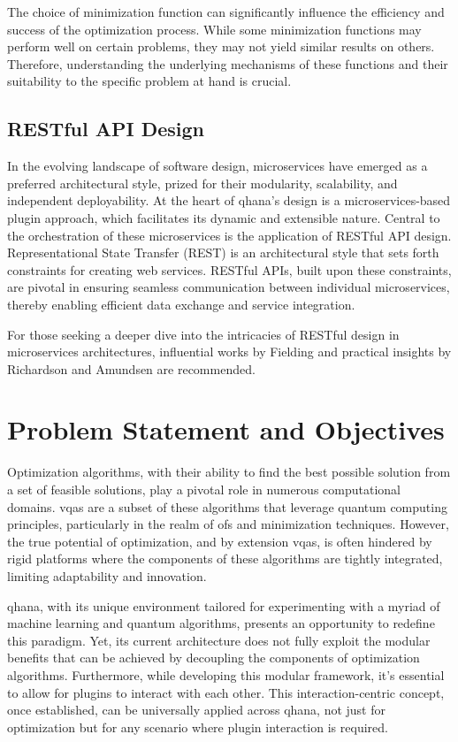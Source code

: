 \documentclass[
  a4paper,  %
  twoside,  %
  bibliography=totoc,
  headsepline,
  cleardoublepage=empty,
  parskip=half,
  draft=false
]{scrbook}
\begin{document}
The choice of minimization function can significantly influence the efficiency and success of the optimization process.
While some minimization functions may perform well on certain problems, they may not yield similar results on others.
Therefore, understanding the underlying mechanisms of these functions and their suitability to the specific problem at hand is crucial.


\section{RESTful API Design}
In the evolving landscape of software design, microservices have emerged as a preferred architectural style, prized for their modularity, scalability, and independent deployability.
At the heart of \gls{qhana}'s design is a microservices-based plugin approach, which facilitates its dynamic and extensible nature.
Central to the orchestration of these microservices is the application of RESTful API design.
Representational State Transfer (REST) is an architectural style that sets forth constraints for creating web services.
RESTful APIs, built upon these constraints, are pivotal in ensuring seamless communication between individual microservices, thereby enabling efficient data exchange and service integration.

For those seeking a deeper dive into the intricacies of RESTful design in microservices architectures, influential works by Fielding \cite{Fielding2000} and practical insights by Richardson and Amundsen \cite{Richardson2013} are recommended.

\chapter{Problem Statement and Objectives}
\label{chap:problem}

Optimization algorithms, with their ability to find the best possible solution from a set of feasible solutions, play a pivotal role in numerous computational domains.
\glspl{vqa} are a subset of these algorithms that leverage quantum computing principles, particularly in the realm of \glspl{of} and minimization techniques.
However, the true potential of optimization, and by extension \glspl{vqa}, is often hindered by rigid platforms where the components of these algorithms are tightly integrated, limiting adaptability and innovation.

\gls{qhana}, with its unique environment tailored for experimenting with a myriad of machine learning and quantum algorithms, presents an opportunity to redefine this paradigm.
Yet, its current architecture does not fully exploit the modular benefits that can be achieved by decoupling the components of optimization algorithms.
Furthermore, while developing this modular framework, it's essential to allow for plugins to interact with each other.
This interaction-centric concept, once established, can be universally applied across \gls{qhana}, not just for optimization but for any scenario where plugin interaction is required.
\end{document}
